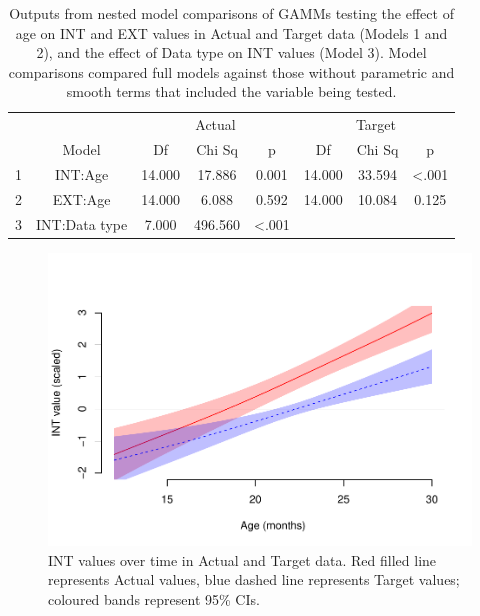 \documentclass[
  man]{apa6}
\begin{document}
\begin{longtable}[t]{cccccccc}
\caption{\label{tab:table-GAMM-outputs}Outputs from nested model comparisons of GAMMs testing the effect of age on INT and EXT values in Actual and Target data (Models 1 and 2), and the effect of Data type on INT values (Model 3). Model comparisons compared full models against those without parametric and smooth terms that included the variable being tested.}\\
\toprule
\multicolumn{2}{c}{ } & \multicolumn{3}{c}{Actual} & \multicolumn{3}{c}{Target} \\
\cmidrule(l{3pt}r{3pt}){3-5} \cmidrule(l{3pt}r{3pt}){6-8}
  & Model & Df & Chi Sq & p & Df & Chi Sq & p\\
\midrule
1 & INT:Age & 14.000 & 17.886 & 0.001 & 14.000 & 33.594 & <.001\\
2 & EXT:Age & 14.000 & 6.088 & 0.592 & 14.000 & 10.084 & 0.125\\
3 & INT:Data type & 7.000 & 496.560 & <.001 &  &  & \\
\bottomrule
\end{longtable}

\begin{figure}
\centering
\includegraphics{PhonNetworksProj-revised_files/figure-latex/figure-GAMM-INT-1.pdf}
\caption{\label{fig:figure-GAMM-INT}INT values over time in Actual and Target data. Red filled line represents Actual values, blue dashed line represents Target values; coloured bands represent 95\% CIs.}
\end{figure}
\end{document}
